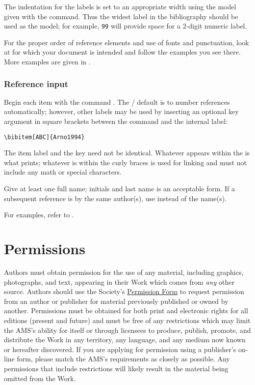 The indentation for the labels is set to an
appropriate width using the model given with the  command.
Thus the widest label in the bibliography should be used as the model;
for example, \verb+99+ will provide space for a 2-digit numeric label.

For the proper order of reference elements and use of fonts and
punctuation, look at
\ifmemoirs
\else for which your document is intended
\fi
and follow the examples you see
there.  More examples are given in \cite{Sw}.

\subsubsection*{Reference input}
Begin each item with the command .
The \latex/ default is to number references automatically; however,
other labels may be used by inserting an optional key argument in
square brackets between the command and the internal label:
\begin{verbatim}
\bibitem[ABC]{Arno1994}
\end{verbatim}
The item label and the key need not be identical.  Whatever appears
within the \opt{ } is what prints; whatever is within the curly
braces is used for linking and must not include any math or special
characters.

Give at least one full name; initials and last name is an acceptable
form.  If a subsequent reference is by the same author(s), use
 instead of the name(s).

For examples, refer to \cite{Sw}.

\section{Permissions}
\noindent
Authors must obtain permission for the use of any material, including
graphics, photographs, and text, appearing in their Work which comes from
\emph{any} other source. Authors should use the Society's
\href{http://www.ams.org/authors/permission-form}{Permission Form}
to request permission from an author or publisher for material previously
published or owned by another.  Permissions must be obtained for both print
and electronic rights for all editions (present and future) and must be free
of any restrictions which may limit the AMS's ability for itself or through
licensees to produce, publish, promote, and distribute the Work in any
territory, any language, and any medium now known or hereafter discovered.
If you are applying for permission using a publisher's on-line form, please
match the AMS's requirements as closely as possible.  Any permissions that
include restrictions will likely result in the material being omitted from
the Work.

